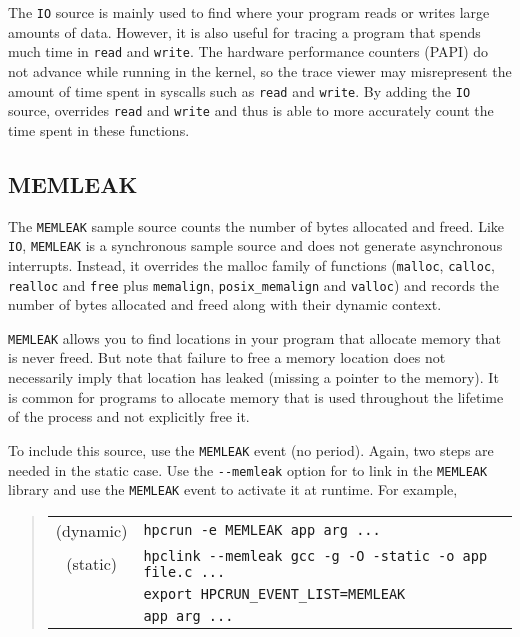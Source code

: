 The \verb|IO| source is mainly used to find where your program reads or
writes large amounts of data.  However, it is also useful for tracing
a program that spends much time in \verb|read| and \verb|write|.  The
hardware performance counters (PAPI) do not advance while running in
the kernel, so the trace viewer may misrepresent the amount of time
spent in syscalls such as \verb|read| and \verb|write|.  By adding the
\verb|IO| source, \hpcrun{} overrides \verb|read| and \verb|write| and
thus is able to more accurately count the time spent in these
functions.

\subsection{MEMLEAK}

The \verb|MEMLEAK| sample source counts the number of bytes allocated
and freed.  Like \verb|IO|, \verb|MEMLEAK| is a synchronous sample
source and does not generate asynchronous interrupts.  Instead, it
overrides the malloc family of functions (\verb|malloc|, \verb|calloc|,
\verb|realloc| and \verb|free| plus \verb|memalign|, \verb|posix_memalign|
and \verb|valloc|) and records the number of bytes
allocated and freed along with their dynamic context.

\verb|MEMLEAK| allows you to find locations in your program that
allocate memory that is never freed.  But note that failure to free a
memory location does not necessarily imply that location has leaked
(missing a pointer to the memory).  It is common for programs to
allocate memory that is used throughout the lifetime of the process
and not explicitly free it.

To include this source, use the \verb|MEMLEAK| event (no period).
Again, two steps are needed in the static case.  Use the \verb|--memleak|
option for \hpclink{} to link in the \verb|MEMLEAK| library
and use the \verb|MEMLEAK| event to activate it at runtime.  For
example,

\begin{quote}
\begin{tabular}{@{}cl}
(dynamic) & \verb|hpcrun -e MEMLEAK app arg ...| \\
(static)  & \verb|hpclink --memleak gcc -g -O -static -o app file.c ...| \\
& \verb|export HPCRUN_EVENT_LIST=MEMLEAK| \\
& \verb|app arg ...|
\end{tabular}
\end{quote}

